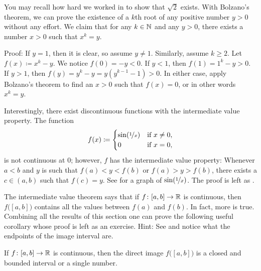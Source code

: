 \begin{example}
You may recall how hard we worked
in 
to show that $\sqrt{2}$ exists.
With Bolzano's
theorem, we can prove the existence of a $k$th root of any positive number
$y > 0$ without any effort.
We claim that for any $k \in {\mathbb{N}}$ and any $y > 0$,
there exists a number $x > 0$ such that $x^k = y$.

Proof: If $y=1$, then it is clear, so assume $y\neq 1$.
Similarly, assume $k \geq 2$.
Let $f(x) \coloneqq x^k - y$.  We notice $f(0) = -y < 0$.
If $y < 1$, then $f(1) = 1^k -y > 0$.  If $y > 1$,
then $f(y) = y^k-y = y(y^{k-1}-1) > 0$.
In either case, apply Bolzano's theorem to find an $x > 0$ such that $f(x) = 0$,
or in other words $x^k = y$.
\end{example}

\begin{example}
Interestingly,
there exist discontinuous functions with
the intermediate value property.
The function
\begin{equation*}
f(x) \coloneqq
\begin{cases}
\sin(\nicefrac{1}{x}) & \text{if } x \neq 0, \\
0 & \text{if } x=0,
\end{cases}
\end{equation*}
is not continuous at $0$; however, $f$ has the intermediate value property:
Whenever $a < b$ and $y$ is such that $f(a) < y < f(b)$
or $f(a) > y > f(b)$,
there exists a $c \in (a,b)$ such that $f(c) = y$.
See  for a graph of $\sin(\nicefrac{1}{x})$.
The proof is left as .
\end{example}

The intermediate value theorem says that if $f \colon [a,b] \to \R$ is
continuous, then $f\bigl([a,b]\bigr)$ contains all the values between $f(a)$ and
$f(b)$.  In fact, more is true.  Combining all the results of this section
one can prove the following useful corollary whose proof is left as an exercise.
Hint: See  and notice what the endpoints of the
image interval are.

\begin{cor} \label{cor:imageofinterval}
If $f \colon [a,b] \to \R$ is continuous, then the direct image
$f\bigl([a,b]\bigr)$
is a closed and bounded interval or a single number.
\end{cor}

\begin{myfigureht}
\caption{The image of a continuous $f \colon [a,b] \to \R$.\label{fig:imageinterval}}
\end{myfigureht}

